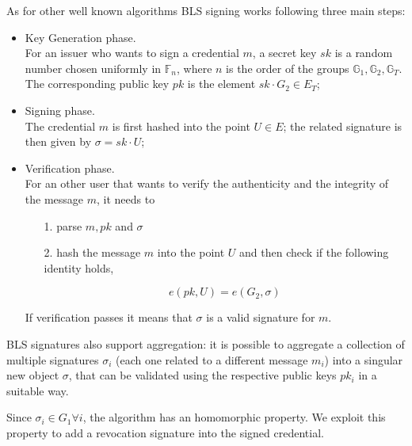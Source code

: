 As for other well known algorithms BLS signing works following three
main steps:
\begin{itemize}

\item Key Generation phase.\\ For an issuer who wants to sign a
  credential $m$, a secret key $sk$ is a random number chosen
  uniformly in $\mathbb{F}_n$, where $n$ is the order of the groups
  $\mathbb{G}_1, \mathbb{G}_2, \mathbb{G}_T$. The corresponding public
  key $pk$ is the element $sk\cdot G_2\in E_T$;

\item Signing phase.\\ The credential $m$ is first hashed into the
  point $U\in E$; the related signature is then given by $\sigma =
  sk\cdot U$;

\item Verification phase.\\ For an other user that wants to verify the
  authenticity and the integrity of the message $m$, it needs to

  \begin{itemize}

  \item [1.] parse $m, pk$ and $\sigma$

  \item [2.] hash the message $m$ into the point $U$ and then
    check if the following identity holds,

    \[
    e(pk,U) = e(G_2,\sigma)
    \]

  \end{itemize}
If verification passes it means that $\sigma$ is a valid signature for
$m$.
\end{itemize}

BLS signatures also support aggregation: it is possible to aggregate a
collection of multiple signatures $\sigma_i$ (each one related to a
different message $m_i$) into a singular new object $\sigma$, that can
be validated using the respective public keys $pk_i$ in a suitable
way.

Since $\sigma_i\in G_1 \forall i$, the algorithm has an homomorphic
property. We exploit this property to add a revocation signature into
the signed credential.

